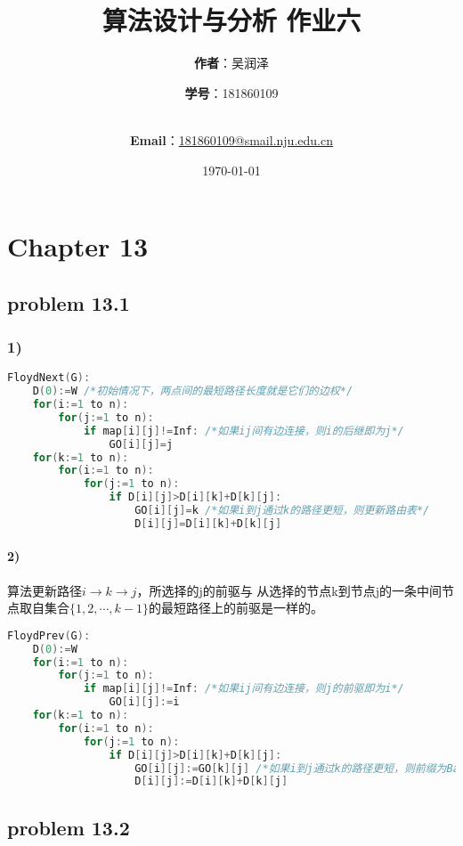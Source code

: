 \documentclass[11pt,a4paper,oneside,oldfontcommands]{ctexart}
\title{\Huge\textbf{算法设计与分析 作业六}\\}
\author{\Large\textbf{作者}：吴润泽 \and{\Large\textbf{学号}：181860109}\\
	\\
	\and {\Large\textbf{Email}：\href{mailto:181860109@smail.nju.edu.cn}{181860109@smail.nju.edu.cn}}\\}
\date{\Large\today}
\begin{document}
\maketitle

\tableofcontents
\cleardoublepage
\section*{Chapter 13}
{\subsection*{problem 13.1}}
\subsubsection*{1)}
\begin{lstlisting}[language=C++,title=FloydNext.func]
FloydNext(G):
	D(0):=W /*初始情况下，两点间的最短路径长度就是它们的边权*/
	for(i:=1 to n):
		for(j:=1 to n):
			if map[i][j]!=Inf: /*如果ij间有边连接，则i的后继即为j*/
				GO[i][j]=j
	for(k:=1 to n):
		for(i:=1 to n):
			for(j:=1 to n):
				if D[i][j]>D[i][k]+D[k][j]:
					GO[i][j]=k /*如果i到j通过k的路径更短，则更新路由表*/
					D[i][j]=D[i][k]+D[k][j]
\end{lstlisting}
\paragraph*{2)}
算法更新路径$i \rightarrow k \rightarrow j$，所选择的j的前驱与
从选择的节点k到节点j的一条中间节点取自集合$\{1,2,\cdots,k-1\}$的最短路径上的前驱是一样的。

\begin{lstlisting}[language=C++,title=FloydPrev.func]
FloydPrev(G):
	D(0):=W
	for(i:=1 to n):
		for(j:=1 to n):
			if map[i][j]!=Inf: /*如果ij间有边连接，则j的前驱即为i*/
				GO[i][j]:=i
	for(k:=1 to n):
		for(i:=1 to n):
			for(j:=1 to n):
				if D[i][j]>D[i][k]+D[k][j]:
					GO[i][j]:=GO[k][j] /*如果i到j通过k的路径更短，则前缀为Back[k][j]*/
					D[i][j]:=D[i][k]+D[k][j]
\end{lstlisting}
{\subsection*{problem 13.2}}
\end{document}
